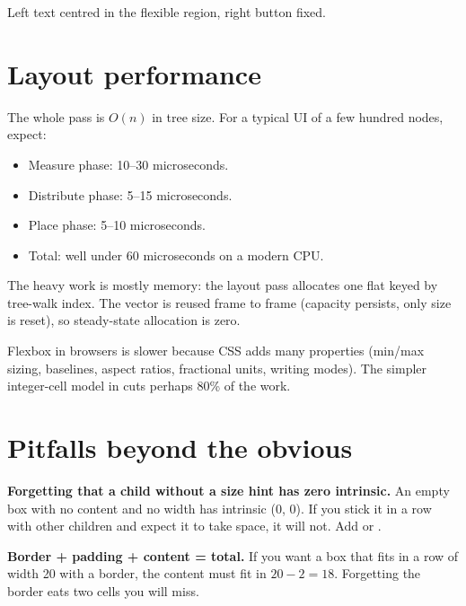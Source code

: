 Left text centred in the flexible region, right button fixed.

\section{Layout performance}

The whole pass is $O(n)$ in tree size. For a typical UI of a few
hundred nodes, expect:

\begin{itemize}[leftmargin=*]
  \item Measure phase: 10--30 microseconds.
  \item Distribute phase: 5--15 microseconds.
  \item Place phase: 5--10 microseconds.
  \item Total: well under 60 microseconds on a modern CPU.
\end{itemize}

The heavy work is mostly memory: the layout pass allocates one
flat  keyed by tree-walk index. The
vector is reused frame to frame (capacity persists, only size is
reset), so steady-state allocation is zero.

\begin{aside}
Flexbox in browsers is slower because CSS adds many properties
(min/max sizing, baselines, aspect ratios, fractional units,
writing modes). The simpler integer-cell model in \maya{} cuts
perhaps 80\% of the work.
\end{aside}

\section{Pitfalls beyond the obvious}

\begin{warning}
\textbf{Forgetting that a child without a size hint has zero
intrinsic.} An empty box with no content and no width has
intrinsic (0, 0). If you stick it in a row with other children
and expect it to take space, it will not. Add 
or .
\end{warning}

\begin{warning}
\textbf{Border + padding + content = total.} If you want a box
that fits in a row of width 20 with a border, the content must
fit in $20 - 2 = 18$. Forgetting the border eats two cells you
will miss.
\end{warning}

